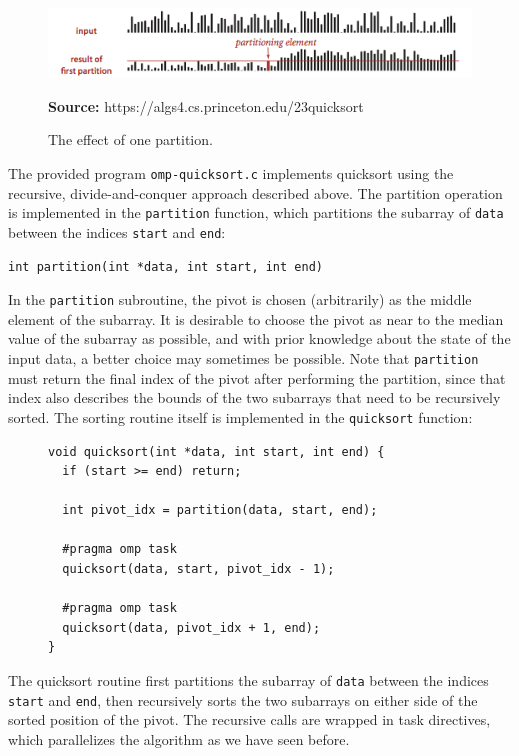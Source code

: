 \documentclass{article}
\theoremstyle{definition}
\begin{document}
\begin{figure}
    \centering
    \includegraphics[width=\textwidth]{images/quicksort-partition.png}
    \caption{The effect of one partition.}
    \textbf{Source:} https://algs4.cs.princeton.edu/23quicksort
    \label{fig/quicksort-partition} 
\end{figure}

The provided program \texttt{omp-quicksort.c} implements quicksort using the recursive, divide-and-conquer approach described above. The partition operation is implemented in the \texttt{partition} function, which partitions the subarray of \texttt{data} between the indices \texttt{start} and \texttt{end}:

\begin{verbatim}
int partition(int *data, int start, int end)
\end{verbatim}

In the \texttt{partition} subroutine, the pivot is chosen (arbitrarily) as the middle element of the subarray. It is desirable to choose the pivot as near to the median value of the subarray as possible, and with prior knowledge about the state of the input data, a better choice may sometimes be possible. Note that \texttt{partition} must return the final index of the pivot after performing the partition, since that index also describes the bounds of the two subarrays that need to be recursively sorted. The sorting routine itself is implemented in the \texttt{quicksort} function:

\begin{figure}[H]
\begin{verbatim}
void quicksort(int *data, int start, int end) {
  if (start >= end) return;
  
  int pivot_idx = partition(data, start, end);
    
  #pragma omp task
  quicksort(data, start, pivot_idx - 1);
    
  #pragma omp task
  quicksort(data, pivot_idx + 1, end);
}
\end{verbatim}
\end{figure}

The quicksort routine first partitions the subarray of \texttt{data} between the indices \texttt{start} and \texttt{end}, then recursively sorts the two subarrays on either side of the sorted position of the pivot. The recursive calls are wrapped in task directives, which parallelizes the algorithm as we have seen before.
\end{document}
